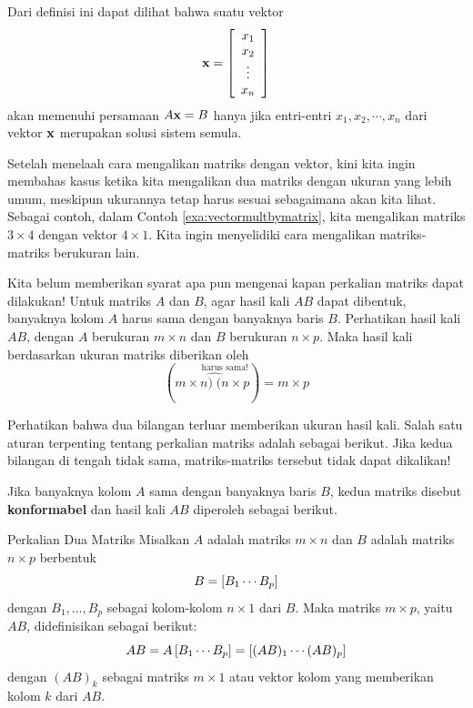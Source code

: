 Dari definisi ini dapat dilihat bahwa suatu vektor
\begin{equation*}
\mathbf{x} =
\left[
\begin{array}{c}
x_{1} \\
x_{2} \\
\vdots \\
x_{n}
\end{array}
\right]
\end{equation*}
akan memenuhi persamaan $A\mathbf{x}=B$
hanya jika entri-entri $x_{1}, x_{2}, \cdots, x_{n}$ dari vektor $\mathbf{x}$ merupakan solusi sistem semula.

Setelah menelaah cara mengalikan matriks dengan vektor, kini kita
ingin membahas kasus ketika kita mengalikan dua matriks dengan ukuran yang lebih
umum, meskipun ukurannya tetap harus sesuai sebagaimana akan kita
lihat. Sebagai contoh, dalam Contoh \ref{exa:vectormultbymatrix}, kita
mengalikan matriks $3 \times 4$ dengan vektor $4 \times 1$. Kita ingin
menyelidiki cara mengalikan matriks-matriks berukuran lain.

Kita belum memberikan syarat apa pun mengenai kapan perkalian matriks
dapat dilakukan! Untuk matriks $A$ dan $B$, agar hasil kali
$AB$ dapat dibentuk, banyaknya kolom $A$ harus sama dengan banyaknya baris
$B.$ Perhatikan hasil kali $AB$, dengan $A$ berukuran $m\times n$ dan $B$
berukuran $n \times p$. Maka hasil kali berdasarkan ukuran matriks
diberikan oleh
\begin{equation*}
(m\times\overset{\text{harus sama!}}{\widehat{n)\;(n}\times p})=m\times p
\end{equation*}

Perhatikan bahwa dua bilangan terluar memberikan ukuran hasil kali. Salah satu aturan terpenting tentang perkalian matriks adalah sebagai berikut.
Jika kedua bilangan di tengah tidak sama, matriks-matriks tersebut tidak dapat dikalikan!

Jika banyaknya kolom $A$ sama dengan banyaknya baris
$B$, kedua matriks disebut \textbf{konformabel}
 dan hasil kali $AB$ diperoleh
 sebagai berikut.

\begin{definition}{Perkalian Dua Matriks}\label{def:multiplicationoftwomatrices}
 Misalkan $A$ adalah matriks $m\times n$
dan $B$ adalah matriks $n\times p$ berbentuk
\begin{equation*}
B=\left[ B_{1} \cdots  B_{p}\right]
\end{equation*}
dengan $B_{1},...,B_{p}$ sebagai kolom-kolom $n\times 1$ dari $B$. Maka
matriks $m\times p$, yaitu $AB$, didefinisikan sebagai berikut:
\begin{equation*}
AB = A \left[ B_{1} \cdots  B_{p}\right] =  \left[ (A B)_{1} \cdots  (AB)_{p}\right] 
\end{equation*}
dengan $(AB)_{k}$ sebagai matriks $m\times 1$ atau vektor kolom yang
memberikan kolom $k$ dari $AB$.
\end{definition}

